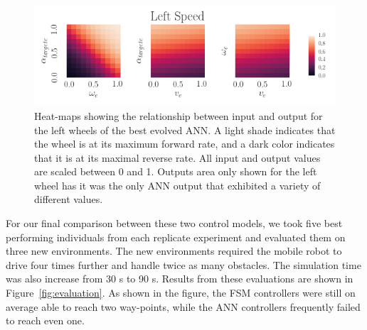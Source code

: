\begin{figure}[!ht]
    \centering


    \includegraphics[width=\columnwidth]{figures/4-results/ann_map.png}


    \caption{Heat-maps showing the relationship between input and output for the left wheels of the best evolved ANN. A light shade indicates that the wheel is at its maximum forward rate, and a dark color indicates that it is at its maximal reverse rate. All input and output values are scaled between 0 and 1. Outputs area only shown for the left wheel has it was the only ANN output that exhibited a variety of different values.}
    \label{fig:ANN-40-2-best-ann-map}


\end{figure}


For our final comparison between these two control models, we took five best performing individuals from each replicate experiment and evaluated them on three new environments. The new environments required the mobile robot to drive four times further and handle twice as many obstacles. The simulation time was also increase from 30 s to 90 s.
%
Results from these evaluations are shown in Figure~\ref{fig:evaluation}.
%
As shown in the figure, the FSM controllers were still on average able to reach two way-points, while the ANN controllers frequently failed to reach even one.


